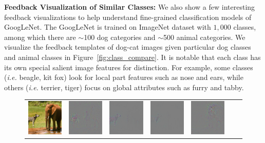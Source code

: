 \textbf{Feedback Visualization of Similar Classes:} We also show a few interesting feedback visualizations to help understand fine-grained classification models of GoogLeNet. The GoogLeNet is trained on ImageNet dataset with $1,000$ classes, among which there are $\sim$100 dog categories and $\sim$500 animal categories. We visualize the feedback templates of dog-cat images given particular dog classes and animal classes in Figure~\ref{fig:class_compare}. It is notable that each class has its own special salient image features for distinction. For example, some classes (\emph{i.e.} beagle, kit fox) look for local part features such as nose and ears, while others (\emph{i.e.} terrier, tiger) focus on global attributes such as furry and tabby.


\setlength{\tabcolsep}{0.5pt}
\begin{figure}
\begin{center}
\begin{tabular}{ccccccc}
\vspace{-2.5pt}
\includegraphics[width=0.14\linewidth,height=0.115\linewidth]{figs/examples/googlenet/soft/zeb-ele1} &
\includegraphics[width=0.14\linewidth,height=0.115\linewidth]{figs/examples/alexnet/soft/zeb-ele1_diff_341} &
\includegraphics[width=0.14\linewidth,height=0.115\linewidth]{figs/examples/vggnet/soft/zeb-ele1_diff_341} &
\includegraphics[width=0.14\linewidth,height=0.115\linewidth]{figs/examples/googlenet/soft/zeb-ele1_diff_341} &
\includegraphics[width=0.14\linewidth,height=0.115\linewidth]{figs/examples/alexnet/soft/zeb-ele1_diff_387} &

\end{tabular}
\end{center}
\end{figure}

